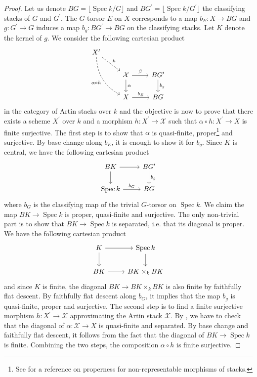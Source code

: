 \documentclass[11pt]{amsart}
\numberwithin{subsection}{section}
\numberwithin{figure}{section}
\numberwithin{table}{section}
\theoremstyle{1}
\theoremstyle{2}
\DeclareMathOperator{\Spec}{Spec}
\begin{document}
\begin{proof}
Let us denote $BG = \lfloor \Spec k / G \rfloor$ and $BG^\prime = \lfloor \Spec k / G^\prime \rfloor$ the classifying stacks of $G$ and $G^\prime$. The $G$-torsor $E$ on $X$ corresponds to a map $b_E : X \rightarrow  BG$ and $g : G^\prime \rightarrow G$ induces a map $b_g : BG^\prime \rightarrow BG$ on the classifying stacks. Let $K$ denote the kernel of $g$. We consider the following cartesian product
\begin{equation*}
\begin{tikzcd}
X^\prime \arrow[rd, dashed, "h"] \arrow[rdd,bend right, dashed, "\alpha \circ h", swap] & & \\
& \mathcal{X} \arrow[d,"\alpha"] \arrow[r,"\beta"] & BG^\prime \arrow[d, "b_g"]\\
& X \arrow[r,"b_E"] & BG
\end{tikzcd}
\end{equation*}
in the category of Artin stacks over $k$ and the objective is now to prove that there exists a scheme $X^\prime$ over $k$ and a morphism $h : X^\prime \rightarrow \mathcal{X}$ such that $\alpha \circ h : X^\prime \rightarrow X$ is finite surjective. The first step is to show that $\alpha$ is quasi-finite, proper\footnote{See \cite[Sect. 10.1]{MR3495343} for a reference on properness for non-representable morphisms of stacks.} and surjective. By base change along $b_E$, it is enough to show it for $b_g$. Since $K$ is central, we have the following cartesian product
\begin{equation*}
\begin{tikzcd}
 BK \arrow[d] \arrow[r] &  BG^\prime \arrow[d, "b_g"]\\
\Spec k \arrow[r,"b_G"] &  BG
\end{tikzcd}
\end{equation*}
where $b_G$ is the classifying map of the trivial $G$-torsor on $\Spec k$. We claim the map $BK \rightarrow \Spec k$ is proper, quasi-finite and surjective. The only non-trivial part is to show that $BK \rightarrow \Spec k$ is separated, i.e. that its diagonal is proper. We have the following cartesian product
\begin{equation*}
\begin{tikzcd}
K \arrow[d] \arrow[r] & \Spec k  \arrow[d]\\
BK \arrow[r] &  BK \times_k  BK
\end{tikzcd}
\end{equation*}
and since $K$ is finite, the diagonal $BK \rightarrow  BK \times_k  BK$ is also finite by faithfully flat descent. By faithfully flat descent along $b_G$, it implies that the map $b_g$ is quasi-finite, proper and surjective. The second step is to find a finite surjective morphism $h : X^\prime \rightarrow \mathcal{X}$ approximating the Artin stack $\mathcal{X}$. By \cite[Theorem B]{MR3272071}, we have to check that the diagonal of $\alpha : \mathcal{X} \rightarrow X$ is quasi-finite and separated. By base change and faithfully flat descent, it follows from the fact that the diagonal of $BK \rightarrow \Spec k$ is finite. Combining the two steps, the composition $\alpha \circ h$ is finite surjective.
\end{proof}
\end{document}
